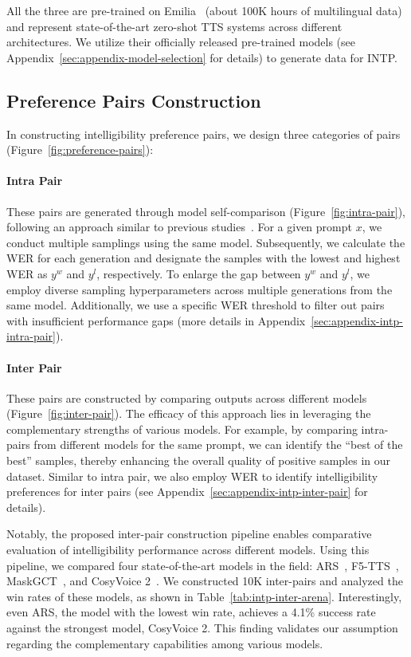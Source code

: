\documentclass[11pt]{article}
\begin{document}
All the three are pre-trained on Emilia~\cite{emilia} (about 100K hours of multilingual data) and represent state-of-the-art zero-shot TTS systems across different architectures. We utilize their officially released pre-trained models (see Appendix~\ref{sec:appendix-model-selection} for details) to generate data for INTP.

\subsection{Preference Pairs Construction}\label{sec:preference-pairs-construction}

In constructing intelligibility preference pairs, we design three categories of pairs (Figure~\ref{fig:preference-pairs}):

\paragraph{Intra Pair} 
These pairs are generated through model self-comparison (Figure~\ref{fig:intra-pair}), following an approach similar to previous studies~\cite{tianjinchuan-pa,fpo,koel-tts}. For a given prompt $x$, we conduct multiple samplings using the same model. Subsequently, we calculate the WER for each generation and designate the samples with the lowest and highest WER as $y^w$ and $y^l$, respectively. To enlarge the gap between $y^w$ and $y^l$, we employ diverse sampling hyperparameters across multiple generations from the same model. Additionally, we use a specific WER threshold to filter out pairs with insufficient performance gaps (more details in Appendix~\ref{sec:appendix-intp-intra-pair}).

\paragraph{Inter Pair} 
These pairs are constructed by comparing outputs across different models (Figure~\ref{fig:inter-pair}). The efficacy of this approach lies in leveraging the complementary strengths of various models. For example, by comparing intra-pairs from different models for the same prompt, we can identify the ``best of the best'' samples, thereby enhancing the overall quality of positive samples in our dataset. Similar to intra pair, we also employ WER to identify intelligibility preferences for inter pairs (see Appendix~\ref{sec:appendix-intp-inter-pair} for details).

Notably, the proposed inter-pair construction pipeline enables comparative evaluation of intelligibility performance across different models. Using this pipeline, we compared four state-of-the-art models in the field: ARS~\cite{maskgct}, F5-TTS~\cite{f5tts}, MaskGCT~\cite{maskgct}, and CosyVoice 2~\cite{cosyvoice2}. We constructed 10K inter-pairs and analyzed the win rates of these models, as shown in Table~\ref{tab:intp-inter-arena}. Interestingly, even ARS, the model with the lowest win rate, achieves a 4.1\% success rate against the strongest model, CosyVoice 2. This finding validates our assumption regarding the complementary capabilities among various models.
\end{document}
